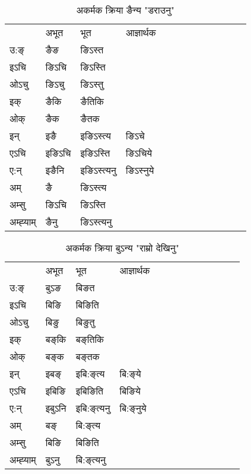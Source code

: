 \begin{table}[H]
\label{in.vi} \centering
\caption{अकर्मक क्रिया  ङैन्य  "डराउनु"  }
\begin{tabular}{l|l|l|l|l|l|l|l|l|l|l|l|l}  \toprule
&अभूत & भूत & आज्ञार्थक \\ 
उ:ङ्‌ &ङैङ &ङिऽस्त \\ 
इऽचि &ङिऽचि &ङिऽस्ति   \\ 
ओऽचु &ङिऽचु &ङिऽस्तु   \\ 
इक् &ङैकि &ङैतिकि   \\ 
ओक् &ङैक &ङैतक   \\ 
इन् & इङै & इङिऽस्त्य &ङिऽचे  \\ 
एऽचि & इङिऽचि & इङिऽस्ति &ङिऽचिये    \\ 
ए:न् & इङैनि  & इङिऽस्त्यनु &ङिऽस्‍नुये  \\ 
अम् & ङै & ङिऽस्त्य   \\ 
अम्सु & ङिऽचि & ङिऽस्ति   \\ 
अम्ह्‍याम् & ङैनु  & ङिऽस्त्यनु \\ 
\bottomrule
\end{tabular}
\end{table}


\begin{table}[H]
\label{iŋ.vi} \centering
\caption{अकर्मक क्रिया  बुऽन्य  "राम्रो देखिनु"  }
\begin{tabular}{l|l|l|l|l|l|l|l|l|l|l|l|l}  \toprule
&अभूत & भूत & आज्ञार्थक \\ 
उ:ङ्‌ &बुऽङ &बिङत \\ 
इऽचि &बिङि &बिङिति   \\ 
ओऽचु &बिङु &बिङुतु   \\ 
इक् &बङ्‌कि &बङ्‌तिकि   \\ 
ओक् &बङ्‌क &बङ्‌तक   \\ 
इन् & इबङ्‌ & इबि:ङ्‌त्य &बि:ङ्‌ये  \\ 
एऽचि & इबिङि & इबिङिति &बिङिये    \\ 
ए:न् & इबुऽनि  & इबि:ङ्‌त्यनु &बि:ङ्‌नुये  \\ 
अम् & बङ्‌ & बि:ङ्‌त्य   \\ 
अम्सु & बिङि & बिङिति   \\ 
अम्ह्‍याम् & बुऽनु  & बि:ङ्‌त्यनु \\ 
\bottomrule
\end{tabular}
\end{table}




